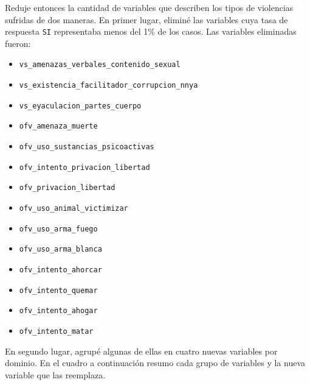 \documentclass[10 pt]{article}
\begin{document}
Reduje entonces la cantidad de variables que describen los tipos de violencias sufridas de dos maneras. En primer lugar, eliminé las variables cuya tasa de respuesta \texttt{SI} representaba menos del 1\% de los casos. Las variables eliminadas fueron:
\begin{multicols}{2}
\begin{itemize}
    \item \texttt{vs\_amenazas\_verbales\_contenido\_sexual} 
    \item \texttt{vs\_existencia\_facilitador\_corrupcion\_nnya}
    \item \texttt{vs\_eyaculacion\_partes\_cuerpo}
    \item \texttt{ofv\_amenaza\_muerte}
    \item \texttt{ofv\_uso\_sustancias\_psicoactivas} 
    \item \texttt{ofv\_intento\_privacion\_libertad}
    \item \texttt{ofv\_privacion\_libertad}
    \item \texttt{ofv\_uso\_animal\_victimizar}
    \item \texttt{ofv\_uso\_arma\_fuego}
    \item \texttt{ofv\_uso\_arma\_blanca}
    \item \texttt{ofv\_intento\_ahorcar}
    \item \texttt{ofv\_intento\_quemar}
    \item \texttt{ofv\_intento\_ahogar}
    \item \texttt{ofv\_intento\_matar}
\end{itemize}
\end{multicols}

En segundo lugar, agrupé algunas de ellas en cuatro nuevas variables por dominio. En el cuadro  a continuación resumo cada grupo de variables y la nueva variable que las reemplaza. 
\end{document}
